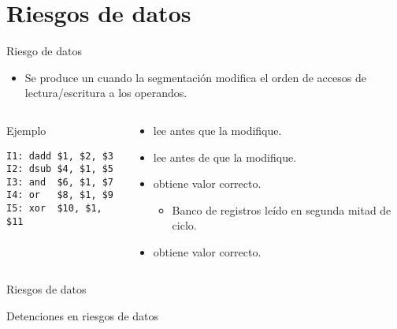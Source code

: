 \section{Riesgos de datos}

\begin{frame}[t,fragile]{Riesgo de datos}
\begin{itemize}
  \item Se produce un  cuando la segmentación 
        modifica el orden de accesos de lectura/escritura a los operandos.
\end{itemize}
\begin{columns}
\begin{column}{.45\textwidth}
\begin{block}{Ejemplo}
\begin{lstlisting}[language={generalasm},basicstyle=\small]
I1: dadd $1, $2, $3
I2: dsub $4, $1, $5
I3: and  $6, $1, $7
I4: or   $8, $1, $9
I5: xor  $10, $1, $11
\end{lstlisting}
\end{block}
\end{column}
\begin{column}{.55\textwidth}
\begin{itemize}
  \item {} lee  antes que  la modifique.
  \item {} lee  antes de que  la modifique.
  \item {} obtiene valor correcto.
    \begin{itemize}
      \item Banco de registros leído en segunda mitad de ciclo.
    \end{itemize}
  \item {} obtiene valor correcto.
\end{itemize}
\end{column}
\end{columns}
\end{frame}
      
\begin{frame}[t]{Riesgos de datos}
\makebox[\textwidth][c]{

}
\end{frame}

\begin{frame}[t]{Detenciones en riesgos de datos}
\makebox[\textwidth][c]{

}
\end{frame}

